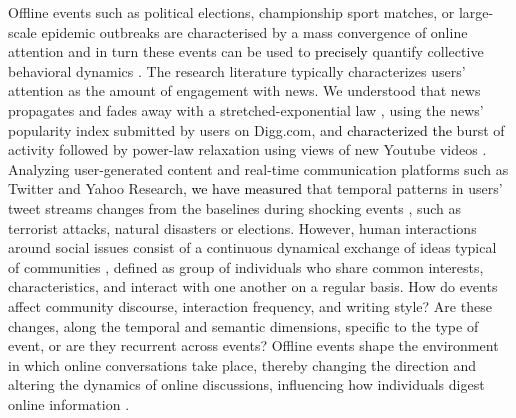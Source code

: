 \documentclass[fleqn,10pt]{wlscirep}
\newcommand{\new}[1]{\textcolor{black}{#1}}
\begin{document}
Offline events such as political elections, championship sport matches, or large-scale epidemic outbreaks are characterised by a mass convergence of online attention and in turn these events can be used to \new{precisely} quantify  collective behavioral dynamics \cite{szell_contraction_2014,lorenz2022systematic}.
The research literature typically characterizes users' attention as the amount of engagement with news.
We understood that news propagates and fades away with a stretched-exponential law \cite{wu2007novelty}, using the news' popularity index submitted by users on Digg.com, and \new{characterized the} burst of activity followed by power-law relaxation using views of new Youtube videos \cite{crane2008robust,yang2011patterns}. 
Analyzing user-generated content and real-time communication platforms such as Twitter and Yahoo Research,
\new{we have measured} that temporal patterns in users' tweet streams changes from the baselines during shocking events \cite{sasahara2013quantifying,he2017measuring},
such as terrorist attacks, natural disasters or elections.
However, human interactions around social issues consist of a continuous dynamical exchange of ideas typical of communities \cite{candia2019universal}, defined as group of individuals who share common interests, characteristics, and interact with one another on a regular basis.
How do events affect community discourse, interaction frequency, and writing style?
Are these changes, along the temporal and semantic dimensions, specific to the type of event, or are they recurrent across events?
Offline events shape the environment in which online conversations take place, thereby changing the direction and altering the dynamics of online discussions, influencing how individuals digest online information \cite{lorenz2022systematic}.
\end{document}
